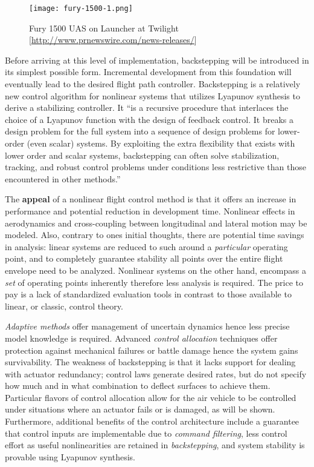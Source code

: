 \documentclass[12pt]{ucthesis}
\begin{document}
\begin{figure}[H]%
	\centering%
	\texttt{[image: fury-1500-1.png]}%
	\caption{Fury 1500 UAS on Launcher at Twilight [\href{http://www.prnewswire.com/news-releases/fury-1500-uas-achieves-14-hour-duration-flight-131211164.html}{http://www.prnewswire.com/news-releases/}]}%
	\label{fig: fury_1500}%
\end{figure}%

Before arriving at this level of implementation, backstepping will be introduced in its simplest possible form. Incremental development from this foundation will eventually lead to the desired flight path controller. Backstepping is a relatively new control algorithm for nonlinear systems that utilizes Lyapunov synthesis to derive a stabilizing controller. It ``is a recursive procedure that interlaces the choice of a Lyapunov function with the design of feedback control. It breaks a design problem for the full system into a sequence of design problems for lower-order (even scalar) systems. By exploiting the extra flexibility that exists with lower order and scalar systems, backstepping can often solve stabilization, tracking, and robust control problems under conditions less restrictive than those encountered in other methods.'' \citet{Khalil1996}

The \textbf{appeal} of a nonlinear flight control method is that it offers an increase in performance and potential reduction in development time. Nonlinear effects in aerodynamics and cross-coupling between longitudinal and lateral motion may be modeled. Also, contrary to ones initial thoughts, there are potential time savings in analysis: linear systems are reduced to such around a \textit{particular} operating point, and to completely guarantee stability all points over the entire flight envelope need to be analyzed. Nonlinear systems on the other hand, encompass a \textit{set} of operating points inherently therefore less analysis is required. The price to pay is a lack of standardized evaluation tools in contrast to those available to linear, or classic, control theory.

\textit{Adaptive methods} offer management of uncertain dynamics hence less precise model knowledge is required. Advanced \textit{control allocation} techniques offer protection against mechanical failures or battle damage hence the system gains survivability. The weakness of backstepping is that it lacks support for dealing with actuator redundancy; control laws generate desired rates, but do not specify how much and in what combination to deflect surfaces to achieve them. Particular flavors of control allocation allow for the air vehicle to be controlled under situations where an actuator fails or is damaged, as will be shown. Furthermore, additional benefits of the control architecture include a guarantee that control inputs are implementable due to \textit{command filtering}, less control effort as useful nonlinearities are retained in \textit{backstepping}, and system stability is provable using Lyapunov synthesis.
\end{document}
